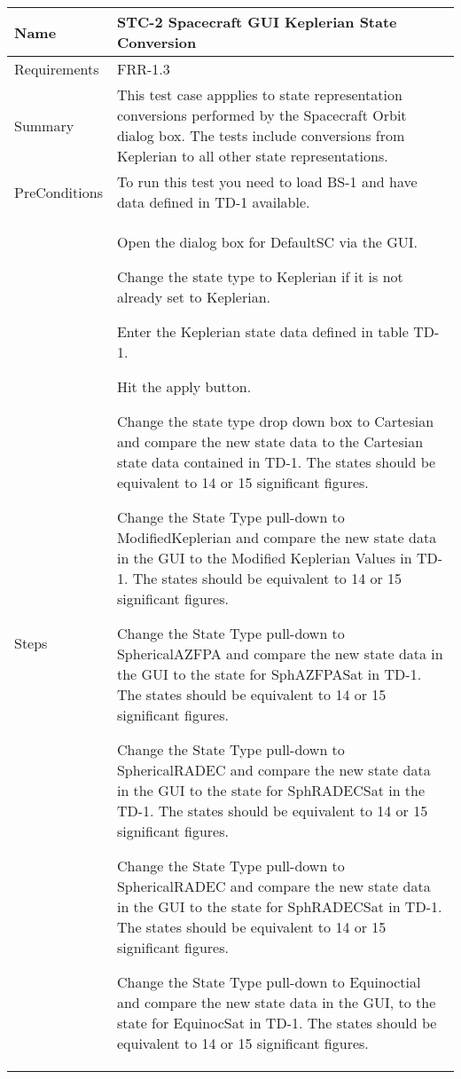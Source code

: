 \begin{table}[htbp!]
\centering
      \begin{tabular}{|p{1.05 in} |p{4.75 in} |}
      \hline
         \rowcolor[rgb]{0.8,0.8,0.8} Name & STC-2 Spacecraft GUI Keplerian State Conversion \\
         \hline
         Requirements & FRR-1.3\\ \hline
         Summary &
         This test case appplies to state representation conversions performed by the Spacecraft Orbit dialog box.   The tests include conversions from Keplerian to all other state representations.\\
         \hline
         PreConditions & To run this test you need to load BS-1 and have data defined in TD-1 available.\\
         \hline
         Steps &
         \begin{compactenum}
         \item Open the dialog box for DefaultSC via the GUI.
         \item Change the state type to Keplerian if it is not already set to Keplerian.
         \item Enter the Keplerian state data defined in table TD-1.
         \item Hit the apply button.
         \item Change the state type drop down box to Cartesian and compare the new state data to the
         Cartesian state data contained in TD-1. The states should be equivalent to 14 or 15 significant figures.
         \item   Change the State Type pull-down to ModifiedKeplerian and compare the new state data in the GUI to
         the Modified Keplerian Values in TD-1.  The states should be equivalent to 14 or 15 significant figures.
         \item   Change the State Type pull-down to SphericalAZFPA and compare the new state data in the GUI to the state for SphAZFPASat in TD-1.  The states should be equivalent to 14 or 15 significant figures.
        \item    Change the State Type pull-down to SphericalRADEC and compare the new state data in the GUI to the state for SphRADECSat in the TD-1.  The states should be equivalent to 14 or 15 significant figures.
        \item    Change the State Type pull-down to SphericalRADEC and compare the new state data in the GUI to the state for SphRADECSat in TD-1.  The states should be equivalent to 14 or 15 significant figures.
       \item     Change the State Type pull-down to Equinoctial and compare the new state data in the GUI, to the state for EquinocSat in TD-1.  The states should be equivalent to 14 or 15 significant figures.
         \end{compactenum}\\


\end{tabular}
\end{table}
